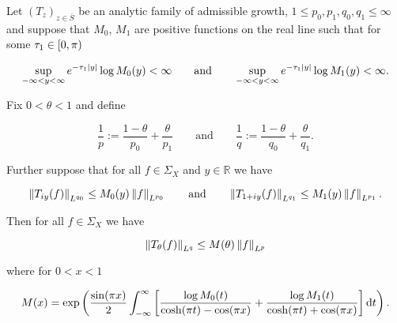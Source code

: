 	\begin{theorem}
		Let $( T_z )_{z \in \overline{S}}$ be an analytic family of admissible growth, $1 \leq p_0,p_1,q_0,q_1 \leq \infty$ and suppose that $M_0$, $M_1$ are positive functions on the real line such that for some $\tau_1 \in \intco{0,\pi}$

			\begin{equation}
				\sup_{-\infty < y <\infty} e^{-\tau_1 \abs[0]{ y }} \log M_0(y) < \infty \qquad \text{and} \qquad \sup_{-\infty < y < \infty} e^{-\tau_1 \abs[0]{ y }} \log M_1(y) < \infty.
				\label{eq:growth_conditions}
			\end{equation}

			Fix $0 < \theta < 1$ and define

			\begin{equation}
				\frac{1}{p} := \frac{1 - \theta}{p_0} + \frac{\theta}{p_1} \qquad \text{and} \qquad \frac{1}{q} := \frac{1 - \theta}{q_0} + \frac{\theta}{q_1}.
			\end{equation}

			Further suppose that for all $f \in \Sigma_X$ and $y \in \mathbb{R}$ we have

			\begin{equation}
				\norm[0]{T_{iy}(f)}_{L^{q_0}} \leq M_0(y)\norm[0]{f}_{L^{p_0}} \qquad \text{and} \qquad \norm[0]{T_{1 + iy}(f)}_{L^{q_1}} \leq M_1(y)\norm[0]{f}_{L^{p_1}}.
			\end{equation}

			Then for all $f \in \Sigma_X$ we have

			\begin{equation*}
				\norm[0]{T_\theta(f)}_{L^q} \leq M(\theta)\norm[0]{f}_{L^p}
			\end{equation*}

			\noindent where for $0 < x < 1$

			\begin{equation*}
				M(x) = \exp\del[3]{ \frac{\sin(\pi x)}{2} \int_{-\infty}^\infty \sbr[3]{ \frac{\log M_0(t)}{\cosh(\pi t) - \cos(\pi x)} + \frac{\log M_1(t)}{\cosh(\pi t) + \cos(\pi x)}} \d t }.
			\end{equation*}
	\end{theorem}

